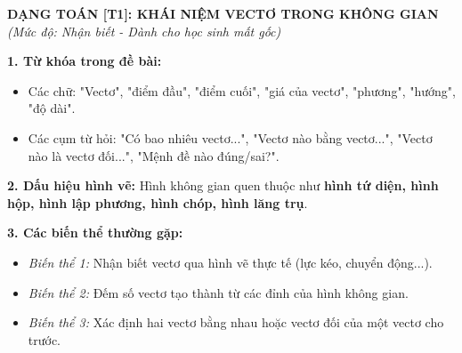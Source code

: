\documentclass[12pt,a4paper]{article}
\begin{document}
\begin{center}
    \Large \textbf{\textcolor{myred}{DẠNG TOÁN [T1]: KHÁI NIỆM VECTƠ TRONG KHÔNG GIAN}} \\
    \vspace{0.2cm}
    \large \textit{(Mức độ: Nhận biết - Dành cho học sinh mất gốc)}
\end{center}

\vspace{0.5cm}

\begin{tcolorbox}[colback=blue!5!white, colframe=myblue, title=\textbf{KHỐI 1: DẤU HIỆU NHẬN DIỆN DẠNG TOÁN (Nhìn phát biết ngay)}]
    \textbf{1. Từ khóa trong đề bài:}
    \begin{itemize}[leftmargin=*, label=+]
        \item Các chữ: "Vectơ", "điểm đầu", "điểm cuối", "giá của vectơ", "phương", "hướng", "độ dài".
        \item Các cụm từ hỏi: "Có bao nhiêu vectơ...", "Vectơ nào bằng vectơ...", "Vectơ nào là vectơ đối...", "Mệnh đề nào đúng/sai?".
    \end{itemize}
    
    \textbf{2. Dấu hiệu hình vẽ:} 
    Hình không gian quen thuộc như \textbf{hình tứ diện, hình hộp, hình lập phương, hình chóp, hình lăng trụ}.
    
    \textbf{3. Các biến thể thường gặp:}
    \begin{itemize}[leftmargin=*, label=+]
        \item \textit{Biến thể 1:} Nhận biết vectơ qua hình vẽ thực tế (lực kéo, chuyển động...).
        \item \textit{Biến thể 2:} Đếm số vectơ tạo thành từ các đỉnh của hình không gian.
        \item \textit{Biến thể 3:} Xác định hai vectơ bằng nhau hoặc vectơ đối của một vectơ cho trước.
    \end{itemize}
\end{tcolorbox}
\end{document}
